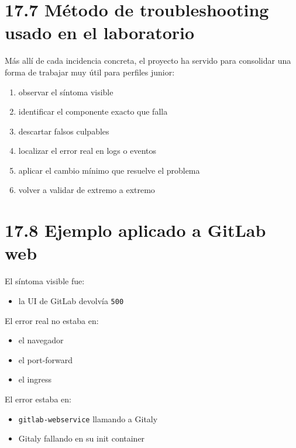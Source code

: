 \documentclass[
a4paper,
12pt]{report}
\providecommand{\tightlist}{%
  \setlength{\itemsep}{0pt}\setlength{\parskip}{0pt}}
\begin{document}
\section{17.7 Método de troubleshooting usado en el
laboratorio}\label{muxe9todo-de-troubleshooting-usado-en-el-laboratorio}

Más allí de cada incidencia concreta, el proyecto ha servido para
consolidar una forma de trabajar muy útil para perfiles junior:

\begin{enumerate}
\def\labelenumi{\arabic{enumi}.}
\tightlist
\item
  observar el síntoma visible\\
\item
  identificar el componente exacto que falla\\
\item
  descartar falsos culpables\\
\item
  localizar el error real en logs o eventos\\
\item
  aplicar el cambio mínimo que resuelve el problema\\
\item
  volver a validar de extremo a extremo
\end{enumerate}

\section{17.8 Ejemplo aplicado a GitLab
web}\label{ejemplo-aplicado-a-gitlab-web}

El síntoma visible fue:

\begin{itemize}
\tightlist
\item
  la UI de GitLab devolvía \texttt{500}
\end{itemize}

El error real no estaba en:

\begin{itemize}
\tightlist
\item
  el navegador
\item
  el port-forward
\item
  el ingress
\end{itemize}

El error estaba en:

\begin{itemize}
\tightlist
\item
  \texttt{gitlab-webservice} llamando a Gitaly
\item
  Gitaly fallando en su init container
\end{itemize}
\end{document}
